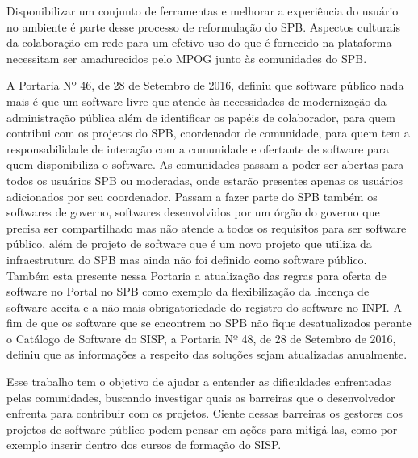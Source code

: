 Disponibilizar um conjunto de ferramentas e melhorar a experiência do usuário no 
ambiente é parte desse processo de reformulação do SPB. Aspectos culturais 
da colaboração em rede para um efetivo uso do que é fornecido na plataforma 
necessitam ser amadurecidos pelo MPOG junto às comunidades do SPB.

A Portaria Nº 46, de 28 de Setembro de 2016, definiu que software público nada mais é
que um software livre que atende às necessidades de modernização da administração 
pública além de identificar os papéis de colaborador, para quem contribui com os projetos do SPB, 
coordenador de comunidade, para quem tem a responsabilidade de interação com a comunidade e 
ofertante de software para quem disponibiliza o software. As comunidades passam a poder
ser abertas para todos os usuários SPB ou moderadas, onde estarão presentes apenas os 
usuários adicionados por seu coordenador. Passam a fazer parte do SPB também os 
softwares de governo, softwares desenvolvidos por um órgão do governo que precisa ser
compartilhado mas não atende a todos os requisitos para ser software público, além de projeto de
software que é um novo projeto que utiliza da infraestrutura do SPB mas ainda não
foi definido como software público.
% 
Também esta presente nessa Portaria a atualização das
regras para oferta de software no Portal no SPB como exemplo da flexibilização
da lincença de software aceita e a não mais obrigatoriedade do registro do 
software no INPI. 
%
A fim de que os software que se encontrem no SPB não fique desatualizados perante
o Catálogo de Software do SISP, a Portaria Nº 48, de 28 de Setembro de 2016, definiu que 
as informações a respeito das soluções sejam atualizadas anualmente.

Esse trabalho tem o objetivo de ajudar a entender as dificuldades enfrentadas
pelas comunidades, buscando investigar quais as barreiras que o desenvolvedor 
enfrenta para contribuir com os projetos. Ciente dessas barreiras os gestores 
dos projetos de software público podem pensar em ações para mitigá-las, como 
por exemplo inserir dentro dos cursos de formação do SISP.

